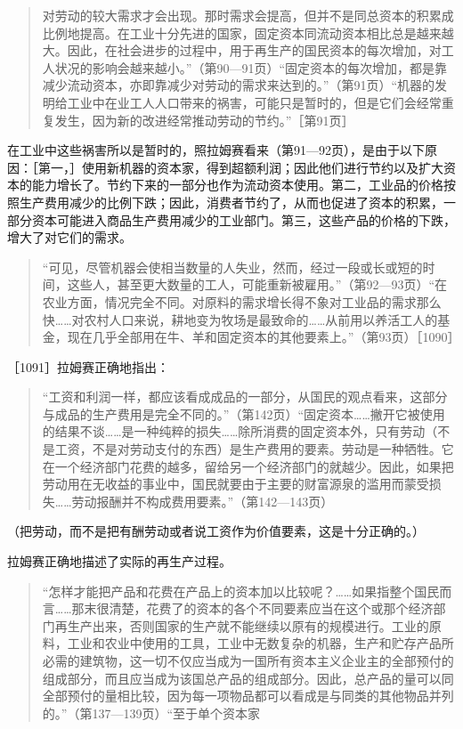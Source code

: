 \begin{quote}{对劳动的较大需求才会出现。那时需求会提高，但并不是同总资本的积累成比例地提高。在工业十分先进的国家，固定资本同流动资本相比总是越来越大。因此，在社会进步的过程中，用于再生产的国民资本的每次增加，对工人状况的影响会越来越小。”（第90—91页）“固定资本的每次增加，都是靠减少流动资本，亦即靠减少对劳动的需求来达到的。”（第91页）“机器的发明给工业中在业工人人口带来的祸害，可能只是暂时的，但是它们会经常重复发生，因为新的改进经常推动劳动的节约。”［第91页］}\end{quote}

在工业中这些祸害所以是暂时的，照拉姆赛看来（第91—92页），是由于以下原因：［第一，］使用新机器的资本家，得到超额利润；因此他们进行节约以及扩大资本的能力增长了。节约下来的一部分也作为流动资本使用。第二，工业品的价格按照生产费用减少的比例下跌；因此，消费者节约了，从而也促进了资本的积累，一部分资本可能进入商品生产费用减少的工业部门。第三，这些产品的价格的下跌，增大了对它们的需求。

\begin{quote}{“可见，尽管机器会使相当数量的人失业，然而，经过一段或长或短的时间，这些人，甚至更大数量的工人，可能重新被雇用。”（第92—93页）“在农业方面，情况完全不同。对原料的需求增长得不象对工业品的需求那么快……对农村人口来说，耕地变为牧场是最致命的……从前用以养活工人的基金，现在几乎全部用在牛、羊和固定资本的其他要素上。”（第93页）［1090］}\end{quote}

［1091］拉姆赛正确地指出：

\begin{quote}{“工资和利润一样，都应该看成成品的一部分，从国民的观点看来，这部分与成品的生产费用是完全不同的。”（第142页）“固定资本……撇开它被使用的结果不谈……是一种纯粹的损失……除所消费的固定资本外，只有劳动（不是工资，不是对劳动支付的东西）是生产费用的要素。劳动是一种牺牲。它在一个经济部门花费的越多，留给另一个经济部门的就越少。因此，如果把劳动用在无收益的事业中，国民就要由于主要的财富源泉的滥用而蒙受损失……劳动报酬并不构成费用要素。”（第142—143页）}\end{quote}

（把劳动，而不是把有酬劳动或者说工资作为价值要素，这是十分正确的。）

拉姆赛正确地描述了实际的再生产过程。

\begin{quote}{“怎样才能把产品和花费在产品上的资本加以比较呢？……如果指整个国民而言……那末很清楚，花费了的资本的各个不同要素应当在这个或那个经济部门再生产出来，否则国家的生产就不能继续以原有的规模进行。工业的原料，工业和农业中使用的工具，工业中无数复杂的机器，生产和贮存产品所必需的建筑物，这一切不仅应当成为一国所有资本主义企业主的全部预付的组成部分，而且应当成为该国总产品的组成部分。因此，总产品的量可以同全部预付的量相比较，因为每一项物品都可以看成是与同类的其他物品并列的。”（第137—139页）“至于单个资本家}\end{quote}

